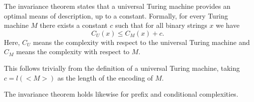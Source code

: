 \documentclass[12pt]{article}
\begin{document}
The invariance theorem states that a universal Turing machine provides an 
optimal means of description, up to a constant. Formally, for every 
Turing machine $M$ there exists a constant $c$ such that for
all binary strings $x$ we have \[C_U(x) \leq C_M(x) + c.\]
Here, $C_U$ means the complexity with respect to the universal
Turing machine and $C_M$ means the complexity with respect to $M$.

This follows trivially from the definition of a universal Turing machine,
taking $c = l(<M>)$ as the length of the encoding of $M$.

The invariance theorem holds likewise for prefix and conditional complexities.
\end{document}
